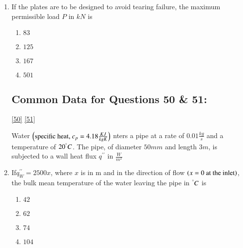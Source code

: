\documentclass[journal]{IEEEtran}
\numberwithin{equation}{enumi}
\numberwithin{figure}{enumi}
\begin{document}
\begin{enumerate}
    \begin{multicols}{4}
        \begin{enumerate}
            \item $7.50$
            \item $15.00$
            \item $22.50$
            \item $30.00$
        \end{enumerate}
    \end{multicols}

    \item 
    If the plates are to be designed to avoid tearing failure, the maximum permissible load $P$ in $kN$ is \label{49}
    \hfill{}

    \begin{multicols}{4}
        \begin{enumerate}
            \item $83$
            \item $125$
            \item $167$
            \item $501$
        \end{enumerate}
    \end{multicols}

    \subsection{Common Data for Questions 50 \& 51: }\ref{50} \ref{51}

    Water $\left(\text{specific heat, } c_p = 4.18 \frac{KJ}{kgK}\right)$ nters a pipe at a rate of $0.01 \frac{kg}{s}$ and a temperature of $20^\degree C$. The pipe, of diameter $50 mm$ and length $3 m$, is subjected to a wall heat flux $q^{\prime\prime}$ in $\frac{W}{m^2}$\\
    
    \item 
    If$q_W^{\prime\prime} = 2500x $, where $x$ is in m and in the direction of flow $\left(x = 0\text{ at the inlet}\right)$, the bulk mean temperature of the water leaving the pipe in $^\degree C$ is \label{50}
    \hfill{}

    \begin{multicols}{4}
        \begin{enumerate}
            \item $42$
            \item $62$
            \item $74$
            \item $104$
        \end{enumerate}
    \end{multicols}


\end{enumerate}
\end{document}
